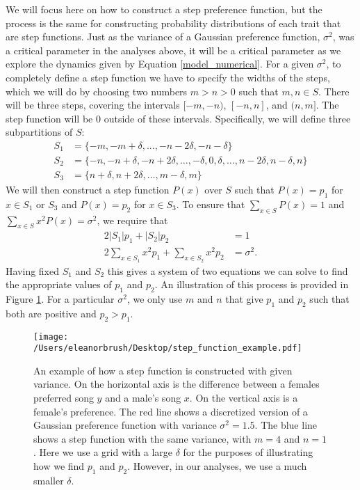 \documentclass{article}
\begin{document}
We will focus here on how to construct a step preference function, but the process is the same for constructing probability distributions of each trait that are step functions. Just as the variance of a Gaussian preference function, $\sigma^2$, was a critical parameter in the analyses above, it will be a critical parameter as we explore the dynamics given by Equation \ref{model_numerical}. For a given $\sigma^2$, to completely define a step function we have to specify the widths of the steps, which we will do by choosing two numbers $m>n>0$ such that $m,n\in S$. There will be three steps, covering the intervals $[-m,-n)$, $[-n,n]$, and $(n,m]$. The step function will be $0$ outside of these intervals. Specifically, we will define three subpartitions of $S$:
\begin{align*}
S_1 & = \{-m,-m+\delta,...,-n-2\delta,-n-\delta\}
\\ S_2&=\{-n,-n+\delta,-n+2\delta,\dots,-\delta,0,\delta,\dots,n-2\delta,n-\delta,n\}
\\ S_3&=\{n+\delta,n+2\delta,\dots,m-\delta,m\}
\end{align*}
We will then construct a step function $P(x)$ over $S$ such that $P(x)=p_1$ for $x\in S_1$ or $S_3$ and $P(x)=p_2$ for $x\in S_3$. To ensure that $\sum_{x\in S}P(x)=1$ and $\sum_{x\in S}x^2P(x)=\sigma^2$, we require that 
\begin{align*}
2|S_1|p_1+|S_2|p_2&=1
\\2\sum_{x\in S_1}x^2p_1+\sum_{x\in S_2}x^2p_2&=\sigma^2.
\end{align*}
Having fixed $S_1$ and $S_2$ this gives a system of two equations we can solve to find the appropriate values of $p_1$ and $p_2$. An illustration of this process is provided in Figure \ref{step_ex}. For a particular $\sigma^2$, we only use $m$ and $n$ that give $p_1$ and $p_2$ such that both are positive and $p_2>p_1$.

\begin{figure}
\texttt{[image: /Users/eleanorbrush/Desktop/step\_function\_example.pdf]}
\caption{\label{step_ex}An example of how a step function is constructed with given variance. On the horizontal axis is the difference between a females preferred song $y$ and a male's song $x$. On the vertical axis is a female's preference. The red line shows a discretized version of a Gaussian preference function with variance $\sigma^2=1.5$. The blue line shows a step function with the same variance, with $m=4$ and $n=1$. Here we use a grid with a large $\delta$ for the purposes of illustrating how we find $p_1$ and $p_2$. However, in our analyses, we use a much smaller $\delta$. }
\end{figure}
\end{document}
